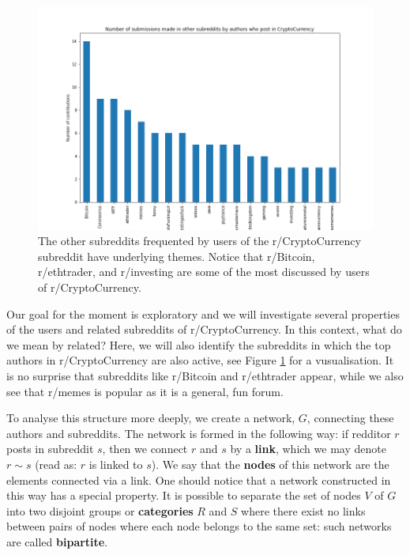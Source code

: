 \documentclass[twoside]{report}
\begin{document}
\begin{spacing}{1}
\begin{figure}
    \centering
    \includegraphics[width=0.8\linewidth]{Reddit_Analysis/Network_Analysis/other_subs_contributions.png}
    \caption{The other subreddits frequented by users of the r/CryptoCurrency subreddit have underlying themes. Notice that r/Bitcoin, r/ethtrader, and r/investing are some of the most discussed by users of r/CryptoCurrency.}
    \label{fig:other_subs_contributions}
\end{figure}



Our goal for the moment is exploratory and we will investigate several properties of the users and related subreddits of r/CryptoCurrency. In this context, what do we mean by related? Here, we will also identify the subreddits in which the top authors in r/CryptoCurrency are also active, see Figure \ref{fig:other_subs_contributions} for a vusualisation. It is no surprise that subreddits like r/Bitcoin and r/ethtrader appear, while we also see that r/memes is popular as it is a general, fun forum.

To analyse this structure more deeply, we create a network, $G$, connecting these authors and subreddits. The network is formed in the following way: if redditor $r$ posts in subreddit $s$, then we connect $r$ and $s$ by a \textbf{link}, which we may denote $r \sim s$ (read as: $r$ is linked to $s$). We say that the \textbf{nodes} of this network are the elements connected via a link. One should notice that a network constructed in this way has a special property. It is possible to separate the set of nodes $V$ of $G$ into two disjoint groups or \textbf{categories} $R$ and $S$ where there exist no links between pairs of nodes where each node belongs to the same set: such networks are called \textbf{bipartite}.


\end{spacing}
\end{document}
